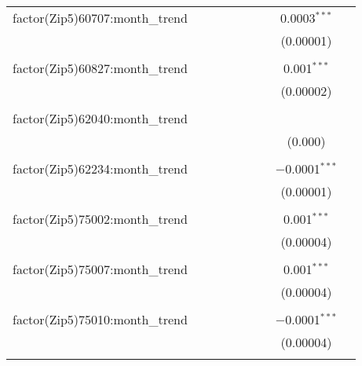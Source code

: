 \begin{table}[H]
{\begin{tabular}{@{\extracolsep{5pt}}lcccccccc}
  factor(Zip5)60707:month\_trend &  &  &  &  &  &  & 0.0003$^{***}$ &  \\  

   &  &  &  &  &  &  & (0.00001) &  \\  

   & & & & & & & & \\  

  factor(Zip5)60827:month\_trend &  &  &  &  &  &  & 0.001$^{***}$ &  \\  

   &  &  &  &  &  &  & (0.00002) &  \\  

   & & & & & & & & \\  

  factor(Zip5)62040:month\_trend &  &  &  &  &  &  &  &  \\  

   &  &  &  &  &  &  & (0.000) &  \\  

   & & & & & & & & \\  

  factor(Zip5)62234:month\_trend &  &  &  &  &  &  & $-$0.0001$^{***}$ &  \\  

   &  &  &  &  &  &  & (0.00001) &  \\  

   & & & & & & & & \\  

  factor(Zip5)75002:month\_trend &  &  &  &  &  &  & 0.001$^{***}$ &  \\  

   &  &  &  &  &  &  & (0.00004) &  \\  

   & & & & & & & & \\  

  factor(Zip5)75007:month\_trend &  &  &  &  &  &  & 0.001$^{***}$ &  \\  

   &  &  &  &  &  &  & (0.00004) &  \\  

   & & & & & & & & \\  

  factor(Zip5)75010:month\_trend &  &  &  &  &  &  & $-$0.0001$^{***}$ &  \\  

   &  &  &  &  &  &  & (0.00004) &  \\  

   & & & & & & & & \\  


\end{tabular}}
\end{table}
